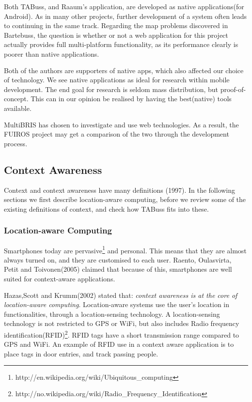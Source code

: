 Both TABuss, and Raaum's application, are developed as native applications(for Android). As in many other projects, further development of a system often leads to continuing in the same track. Regarding the map problems discovered in Bartebuss, the question is whether or not a web application for this project actually provides full multi-platform functionality, as its performance clearly is poorer than native applications.

Both of the authors are supporters of native apps, which also affected our choice of technology. We see native applications as ideal for research within mobile development. The end goal for research is seldom mass distribution, but proof-of-concept. This can in our opinion be realised by having the best(native) tools available. 


MultiBRIS\cite{multibris} has chosen to investigate and use web technologies. As a result, the FUIROS project may get a comparison of the two through the development process.

\subsection{Context Awareness}
\label{sec:catechnology}
Context and context awareness have many definitions \cite{Pascoe} \cite{Schilit} \cite{Ryan} \cite{Dey}(1997). In the following sections we first describe location-aware computing, before we review some of the existing definitions of context, and check how TABuss fits into these.
\subsubsection{Location-aware Computing}
Smartphones today are pervasive\footnote{http://en.wikipedia.org/wiki/Ubiquitous\_computing} and personal. This means that they are almost always turned on, and they are customised to each user. Raento, Oulasvirta, Petit and Toivonen(2005) claimed that because of this, smartphones are well suited for context-aware applications\cite{raento}.

Hazas,Scott and Krumm(2002) stated that: \emph{context awareness is at the core of location-aware computing\cite{hazas}}. Location-aware systems use the user's location in functionalities, through a location-sensing technology. A location-sensing technology is not restricted to GPS or WiFi, but also includes Radio frequency identification(RFID)\footnote{http://no.wikipedia.org/wiki/Radio\_Frequency\_Identification}. RFID tags have a short transmission range compared to GPS and WiFi. An example of RFID use in a context aware application is to place tags in door entries, and track passing people.

